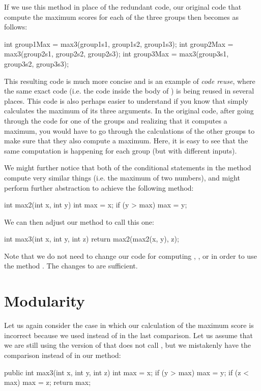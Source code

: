 If we use this method in place of the redundant code,
our original code that compute the maximum scores for each of the three
groups then becomes as follows:
\begin{code}
int group1Max = max3(group1s1, group1s2, group1s3);
int group2Max = max3(group2s1, group2s2, group2s3);
int group3Max = max3(group3s1, group3s2, group3s3);
\end{code}
This resulting code is much more concise and is an example
of \emph{code reuse}, where the same exact code
(i.e. the code inside the body of ) is being reused
in several places. This code is also perhaps easier to understand
if you know that  simply calculates the maximum
of its three arguments. In the original code, after
going through the code for one of the groups
and realizing that it computes a maximum, you
would have to go through the calculations of the other
groups to make sure that they also compute a maximum.
Here, it is easy to see that the same computation is happening
for each group (but with different inputs).

We might further notice that both of the conditional statements
in the  method
compute very similar things (i.e. the maximum of two numbers),
and might perform further abstraction to achieve the following
method:
\begin{code}
int max2(int x, int y) {
  int max = x;
  if (y > max) {
    max = y; 
  }
}
\end{code}

We can then adjust our  method to call this one:
\begin{code}
int max3(int x, int y, int z) {
  return max2(max2(x, y), z);
}
\end{code}

Note that we do not need to change our code
for computing , ,
or  in order to use the method
. The changes to  are sufficient.

\section{Modularity}\label{sec:modularity}
Let us again consider the case in which our calculation of the maximum
score is incorrect because we used \ic{<} instead of \ic{>} in
the last comparison. Let us assume that we are still using the
version of  that does not call , but
we mistakenly have the comparison  instead of
 in our method:
\begin{code}
public int max3(int x, int y, int z) {
  int max = x;
  if (y > max) {
    max = y;
  }
  if (z < max) {
    max = z;
  }
  return max;
}
\end{code}

